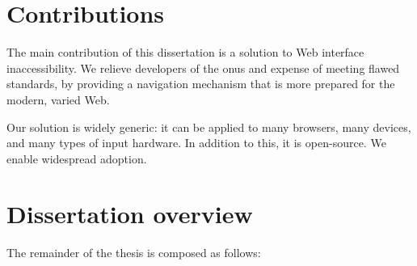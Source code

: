 \documentclass[11pt,openright,a4paper]{report}
\begin{document}
\section{Contributions}
The main contribution of this dissertation is a solution to Web interface inaccessibility. We relieve developers of the onus and expense of meeting flawed standards, by providing a navigation mechanism that is more prepared for the modern, varied Web.

Our solution is widely generic: it can be applied to many browsers, many devices, and many types of input hardware. In addition to this, it is open-source. We enable widespread adoption.





\section{Dissertation overview}
\newcommand{\chapterref}[2]{\item \Cref{#1}, \textit{#2},}
The remainder of the thesis is composed as follows:
\end{document}
